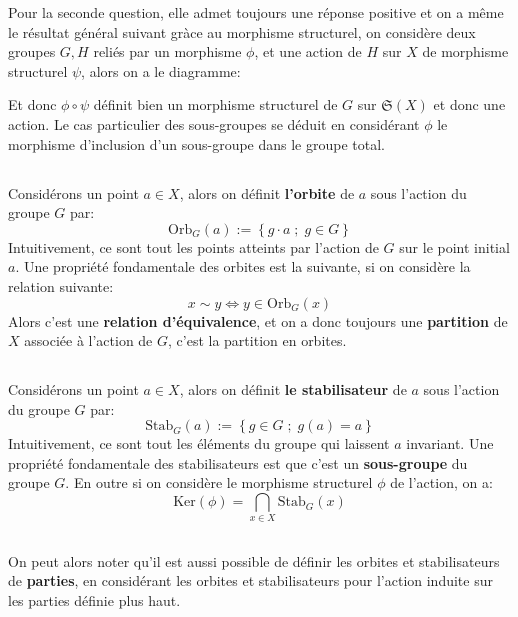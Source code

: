 Pour la seconde question, elle admet toujours une réponse positive et on a même le résultat général suivant gràce au morphisme structurel, on considère deux groupes \( G, H \) reliés par un morphisme \( \phi \), et une action de \( H \) sur \( X \) de morphisme structurel \( \psi \), alors on a le diagramme:
\begin{center}
\end{center}
Et donc \( \phi \circ \psi \) définit bien un morphisme structurel de \( G \) sur \( \mathfrak{S}(X) \) et donc une action. Le cas particulier des sous-groupes se déduit en considérant \( \phi \) le morphisme d'inclusion d'un sous-groupe dans le groupe total.
\pagebreak

\subsection*{}
Considérons un point \( a \in X \), alors on définit \textbf{l'orbite} de \( a \) sous l'action du groupe \( G \) par:
\[ 
   \text{Orb}_G(a) := \left\{ g \cdot a \; ; \; g \in G \right\} 
\]
Intuitivement, ce sont tout les points atteints par l'action de \( G \) sur le point initial \( a \). Une propriété fondamentale des orbites est la suivante, si on considère la relation suivante:
\[ 
   x \sim y \iff y \in \text{Orb}_G(x)
\]
Alors c'est une \textbf{relation d'équivalence}, et on a donc toujours une \textbf{partition} de \( X \) associée à l'action de \( G \), c'est la partition en orbites.
\subsection*{}
Considérons un point \( a \in X \), alors on définit \textbf{le stabilisateur} de \( a \) sous l'action du groupe \( G \) par:
\[ 
   \text{Stab}_G(a) := \left\{ g \in G \; ; \; g(a) = a\right\} 
\]
Intuitivement, ce sont tout les éléments du groupe qui laissent \( a \) invariant. Une propriété fondamentale des stabilisateurs est que c'est un \textbf{sous-groupe} du groupe \( G \). En outre si on considère le morphisme structurel \( \phi \) de l'action, on a:
\[ 
   \text{Ker}( \phi) = \bigcap_{x \in X} \text{Stab}_G(x) 
\]
\subsection*{}
On peut alors noter qu'il est aussi possible de définir les orbites et stabilisateurs de \textbf{parties}, en considérant les orbites et stabilisateurs pour l'action induite sur les parties définie plus haut.
